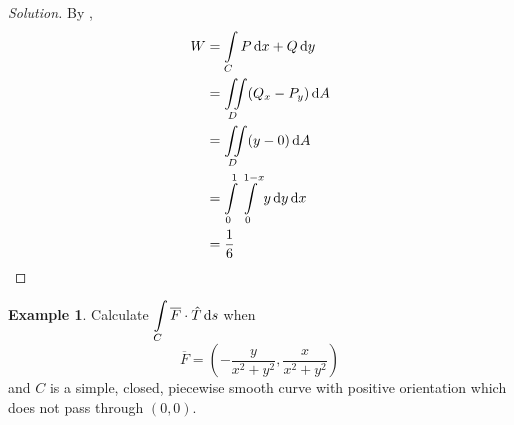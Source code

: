 \documentclass[fleqn, a4paper, 12pt]{article}
\theoremstyle{definition}
\newtheorem{example}{Example}
\theoremstyle{theorem}
\theoremstyle{remark}
\newenvironment{solution}
{\begin{proof}[Solution]\let\qed\relax}
	{\end{proof}}
\begin{document}
\begin{solution}
	By ,
	\begin{align*}
				W &= \int\limits_{C} P \dif x + Q \dif y \\
				&= \iint\limits_{D} (Q_x - P_y) \dif A\\
				&= \iint\limits_{D} (y - 0) \dif A\\
				&= \int\limits_{0}^{1} \int\limits_{0}^{1 - x} y \dif y \dif x\\
				&= \dfrac{1}{6}
	\end{align*}
\end{solution}

\begin{example}
	Calculate $\displaystyle \int\limits_{C} \overline{F} \cdot \hat{T} \dif s$ when
	\begin{equation*}
		\overline{F} = \left( -\dfrac{y}{x^2 + y^2} , \dfrac{x}{x^2 + y^2} \right)
	\end{equation*}
	and $C$ is a simple, closed, piecewise smooth curve with positive orientation which does not pass through $(0,0)$.
\end{example}
\end{document}
